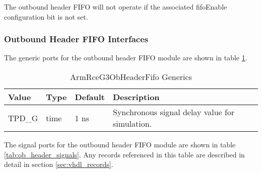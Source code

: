 \documentclass[11pt]{article}
\begin{document}
The outbound header FIFO will not operate if the associated fifoEnable configuration bit is not set.

\subsubsection{Outbound Header FIFO Interfaces}

The generic ports for the outbound header FIFO module are shown in table \ref{tab:ob_header_generics}.

\begin{table}[H]
\small
\centering
   \begin{tabular}{| l | l | l | l | }
      \hline \textbf{Value} & \textbf{Type} & \textbf{Default} & \textbf{Description} \\
      \hline TPD\_G          & time     & 1 ns & Synchronous signal delay value for simulation.    \\
      \hline
   \end{tabular}
   \caption{ArmRceG3ObHeaderFifo Generics}
   \label{tab:ob_header_generics}
\end{table}

The signal ports for the outbound header FIFO module are shown in table \ref{tab:ob_header_signals}.
Any records referenced in this table are described in detail in section \ref{sec:vhdl_records}. 
\end{document}
